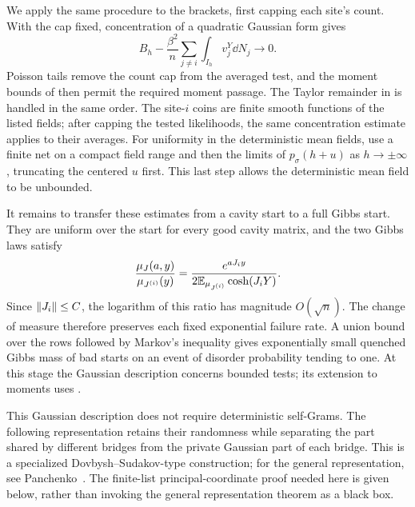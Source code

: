 We apply the same procedure to the brackets, first capping each site's
count.  With the cap fixed, concentration of a quadratic Gaussian form
gives
\begin{equation}
 B_h-\frac{\beta^2}{n}\sum_{j\ne i}
                   \int_{I_h}v_j^Y\dd N_j\longrightarrow0.
 \label{eq:row-bracket-replacement}
\end{equation}
Poisson tails remove the count cap from the averaged test, and the
moment bounds of  then permit the
required moment passage.  The Taylor remainder in
 is handled in the same order.  The site-$i$ coins are finite smooth
functions of the listed fields; after capping the tested likelihoods,
the same concentration estimate applies to their averages.  For uniformity in the deterministic mean fields, use a finite net on a
compact field range and then the limits of $p_\sigma(h+u)$ as
$h\to\pm\infty$, truncating the centered $u$ first.  This last step
allows the deterministic mean field to be unbounded.

It remains to transfer these estimates from a cavity start to a full
Gibbs start.  They are uniform over the start for every good cavity
matrix, and the two Gibbs laws satisfy
\[
 \frac{\mu_J(a,y)}{\mu_{J^{(i)}}(y)}
    =\frac{e^{aJ_iy}}{2\mathbb E_{\mu_{J^{(i)}}}\cosh(J_iY)}.
\]
Since $\left\lVert J_i\right\rVert\le C$, the logarithm of this ratio has magnitude
$O(\sqrt n)$.  The change of measure therefore preserves each fixed exponential
failure rate.  A union bound over the rows followed by Markov's
inequality gives exponentially small quenched Gibbs mass of bad starts
on an event of disorder probability tending to one.  At this stage the
Gaussian description concerns bounded tests; its extension to moments
uses .

This Gaussian description does not require deterministic self-Grams.
The following representation retains their randomness while separating
the part shared by different bridges from the private Gaussian part of
each bridge. This is a specialized Dovbysh--Sudakov-type construction;
for the general representation, see Panchenko~\cite[Proposition~1,
equation~(1.2), and Lemmas~2--3]{Panchenko2010DS}. The finite-list
principal-coordinate proof needed here is given below, rather than
invoking the general representation theorem as a black box.

